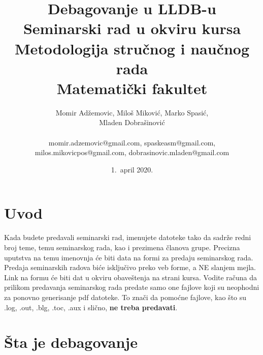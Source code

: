 \documentclass[a4paper]{article}
\begin{document}
\title{Debagovanje u LLDB-u\\ \small{Seminarski rad u okviru kursa\\Metodologija stručnog i naučnog rada\\ Matematički fakultet}}

\author{Momir Adžemovic, Miloš Miković, Marko Spasić,\\ Mladen Dobrašinović\\ \\ momir.adzemovic@gmail.com, spaskeasm@gmail.com,\\ milos.mikovicpos@gmail.com, dobrasinovic.mladen@gmail.com}

\date{1.~april 2020.}

\maketitle


\tableofcontents

\newpage

\section{Uvod}
\label{sec:uvod}

Kada budete predavali seminarski rad, imenujete datoteke tako da sadrže redni broj teme, temu seminarskog rada, kao i prezimena članova grupe. Precizna uputstva na temu imenovnja će biti data na formi za predaju seminarskog rada. Predaja seminarskih radova biće isključivo preko veb forme, a NE slanjem mejla. Link na formu će biti dat u okviru obaveštenja na strani kursa. Vodite računa da prilikom predavanja seminarskog rada predate samo one fajlove koji su neophodni za ponovno generisanje pdf datoteke. To znači da pomoćne fajlove, kao što su .log, .out, .blg, .toc, .aux i slično, \textbf{ne treba predavati}.

\section{Šta je debagovanje}
\label{sec:sta je debagovanje}
\cite{debagovanje_vladaf}
\cite{bagovi_smalkov}
\end{document}
